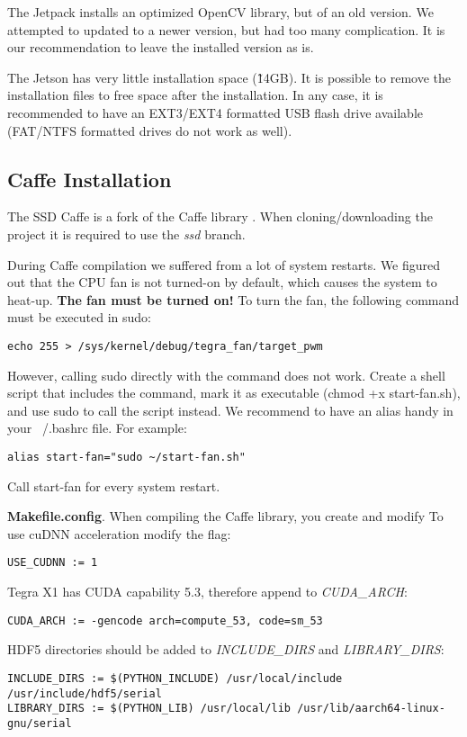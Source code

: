 The Jetpack installs an optimized OpenCV library, but of an old version. We attempted to updated to a newer version, but had too many complication. It is our recommendation to leave the installed version as is.

The Jetson has very little installation space (\~14GB). It is possible to remove the installation files to free space after the installation. In any case, it is recommended to have an EXT3/EXT4 formatted USB flash drive available (FAT/NTFS formatted drives do not work as well). 

\subsection{Caffe Installation}

The SSD Caffe \cite{caffessd} is a fork of the Caffe library \cite{caffeoriginal}. When cloning/downloading the project it is required to use the \textit{ssd} branch.

During Caffe compilation we suffered from a lot of system restarts. We figured out that the CPU fan is not turned-on by default, which causes the system to heat-up. \textbf{The fan must be turned on!} To turn the fan, the following command must be executed in sudo:
\begin{lstlisting} 
echo 255 > /sys/kernel/debug/tegra_fan/target_pwm
\end{lstlisting}
However, calling sudo directly with the command does not work. Create a shell script that includes the command, mark it as executable (chmod +x start-fan.sh), and use sudo to call the script instead. We recommend to have an alias handy in your ~/.bashrc file. For example:
\begin{lstlisting} 
alias start-fan="sudo ~/start-fan.sh"
\end{lstlisting}
Call start-fan for every system restart.

\textbf{Makefile.config}. 
When compiling the Caffe library, you create and modify 
To use cuDNN acceleration modify the flag:
\begin{lstlisting} 
USE_CUDNN := 1
\end{lstlisting}

Tegra X1 has CUDA capability 5.3, therefore append to \textit{CUDA\_ARCH}: 
\begin{lstlisting} 
CUDA_ARCH := -gencode arch=compute_53, code=sm_53
\end{lstlisting}

HDF5 directories should be added to \textit{INCLUDE\_DIRS} and \textit{LIBRARY\_DIRS}:
\begin{lstlisting} 
INCLUDE_DIRS := $(PYTHON_INCLUDE) /usr/local/include /usr/include/hdf5/serial
LIBRARY_DIRS := $(PYTHON_LIB) /usr/local/lib /usr/lib/aarch64-linux-gnu/serial
\end{lstlisting}

